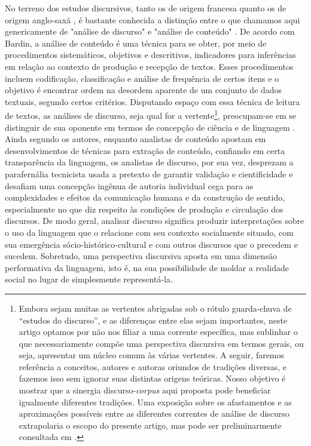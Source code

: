\documentclass[portuguese]{textolivre}
\begin{document}
No terreno dos estudos discursivos, tanto os de origem francesa \cite[por exemplo]{maingueneau2015} quanto os de origem anglo-saxã \cite[por exemplo]{fairclough1992}, é bastante conhecida a distinção entre o que chamamos aqui genericamente de "análise de discurso" e "análise de conteúdo" \cite{bardln1977}. De acordo com Bardin, a análise de conteúdo é uma técnica para se obter, por meio de procedimentos sistemáticos, objetivos e descritivos, indicadores para inferências em relação ao contexto de produção e recepção de textos. Esses procedimentos incluem codificação, classificação e análise de frequência de certos itens e o objetivo é encontrar ordem na desordem aparente de um conjunto de dados textuais, segundo certos critérios. Disputando espaço com essa técnica de leitura de textos, as análises de discurso, seja qual for a vertente\footnote{Embora sejam muitas as vertentes abrigadas sob o rótulo guarda-chuva de “estudos do discurso”, e as diferenças entre elas sejam importantes, neste artigo optamos por não nos filiar a uma corrente específica, mas sublinhar o que necessariamente compõe uma perspectiva discursiva em termos gerais, ou seja, apresentar um núcleo comum às várias vertentes. A seguir, faremos referência a conceitos, autores e autoras oriundos de tradições diversas, e fazemos isso sem ignorar suas distintas origens teóricas. Nosso objetivo é mostrar que a sinergia discurso-\textit{corpus} aqui proposta pode beneficiar igualmente diferentes tradições. Uma exposição sobre os afastamentos e as aproximações possíveis entre as diferentes correntes de análise de discurso extrapolaria o escopo do presente artigo, mas pode ser preliminarmente consultada em \textcite{oliveira2013}.}, preocupam-se em se distinguir de sua oponente em termos de concepção de ciência e de linguagem \cite{rocha2005}. Ainda segundo os autores, enquanto analistas de conteúdo apostam em desenvolvimentos de técnicas para extração de conteúdo, confiando em certa transparência da linguagem, os analistas de discurso, por sua vez, desprezam a parafernália tecnicista usada a pretexto de garantir validação e cientificidade e desafiam uma concepção ingênua de autoria individual cega para as complexidades e efeitos da comunicação humana e da construção de sentido, especialmente no que diz respeito às condições de produção e circulação dos discursos. De modo geral, analisar discurso significa produzir interpretações sobre o uso da linguagem que o relacione com seu contexto socialmente situado, com sua emergência sócio-histórico-cultural e com outros discursos que o precedem e sucedem. Sobretudo, uma perspectiva discursiva aposta em uma dimensão performativa da linguagem, isto é, na sua possibilidade de moldar a realidade social no lugar de simplesmente representá-la.
\end{document}

